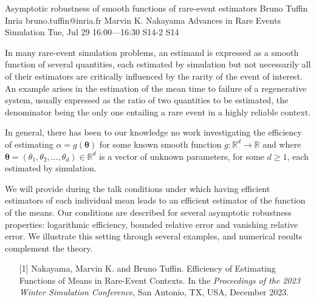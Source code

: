 \begin{talk}
  {Asymptotic robustness of  smooth functions of  rare-event estimators}%
  {Bruno Tuffin}%
  {Inria}%
  {bruno.tuffin@inria.fr}%
  {Marvin K. Nakayama}%
  {Advances in Rare Events Simulation}%
  {Tue, Jul 29 16:00---16:30}%
  {S14-2}%
  {S14}%
    
   
In many rare-event simulation problems, an estimand is expressed  as a smooth function of several quantities,  each
estimated by simulation  but not necessarily all of their estimators are critically influenced by
the rarity of the event of interest.  
An example arises in the estimation of the mean time to failure of a regenerative system, usually expressed as the ratio of two quantities to be estimated, the denominator being the only one  entailing a rare event in a highly reliable context.

In general, there has been to our knowledge no work investigating  the efficiency  of estimating $\alpha = g({\boldsymbol{\theta}})$
for some known  smooth function $g : \mathbb{R}^d \to \mathbb{R}$ and where ${\boldsymbol{\theta}} = (\theta_1, \theta_2, \ldots, \theta_d) \in \mathbb{R}^d$ is a vector of unknown parameters, for some $d \geq 1$, each  estimated by simulation.

We will provide during the talk conditions under which having efficient estimators of each individual mean leads to an efficient estimator of the function of the means. Our conditions are described for several asymptotic robustness properties: logarithmic efficiency, bounded relative error and vanishing relative error.
We illustrate this setting through several examples, and numerical results complement the theory.


   

\medskip


\begin{enumerate}
 \item[{[1]}]  Nakayama, Marvin K. and Bruno Tuffin.  Efficiency of Estimating Functions of Means in Rare-Event Contexts. In the {\it Proceedings of the 2023 Winter Simulation Conference}, San Antonio, TX, USA, December 2023.
\end{enumerate}

\end{talk}

